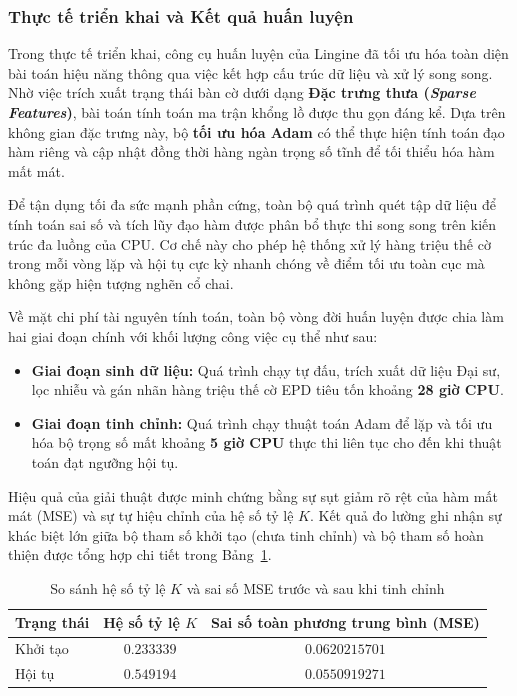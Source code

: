\subsubsection{Thực tế triển khai và Kết quả huấn luyện}

Trong thực tế triển khai, công cụ huấn luyện của Lingine đã tối ưu hóa toàn diện bài toán hiệu năng thông qua việc kết hợp cấu trúc dữ liệu và xử lý song song. Nhờ việc trích xuất trạng thái bàn cờ dưới dạng \textbf{Đặc trưng thưa (\textit{Sparse Features})}, bài toán tính toán ma trận khổng lồ được thu gọn đáng kể. Dựa trên không gian đặc trưng này, bộ \textbf{tối ưu hóa Adam} có thể thực hiện tính toán đạo hàm riêng và cập nhật đồng thời hàng ngàn trọng số tĩnh để tối thiểu hóa hàm mất mát.

Để tận dụng tối đa sức mạnh phần cứng, toàn bộ quá trình quét tập dữ liệu để tính toán sai số và tích lũy đạo hàm được phân bổ thực thi song song trên kiến trúc đa luồng của CPU. Cơ chế này cho phép hệ thống xử lý hàng triệu thế cờ trong mỗi vòng lặp và hội tụ cực kỳ nhanh chóng về điểm tối ưu toàn cục mà không gặp hiện tượng nghẽn cổ chai.

Về mặt chi phí tài nguyên tính toán, toàn bộ vòng đời huấn luyện được chia làm hai giai đoạn chính với khối lượng công việc cụ thể như sau:
\begin{itemize}
    \item \textbf{Giai đoạn sinh dữ liệu:} Quá trình chạy tự đấu, trích xuất dữ liệu Đại sư, lọc nhiễu và gán nhãn hàng triệu thế cờ EPD tiêu tốn khoảng \textbf{28 giờ CPU}.
    \item \textbf{Giai đoạn tinh chỉnh:} Quá trình chạy thuật toán Adam để lặp và tối ưu hóa bộ trọng số mất khoảng \textbf{5 giờ CPU} thực thi liên tục cho đến khi thuật toán đạt ngưỡng hội tụ.
\end{itemize}

Hiệu quả của giải thuật được minh chứng bằng sự sụt giảm rõ rệt của hàm mất mát (MSE) và sự tự hiệu chỉnh của hệ số tỷ lệ $K$. Kết quả đo lường ghi nhận sự khác biệt lớn giữa bộ tham số khởi tạo (chưa tinh chỉnh) và bộ tham số hoàn thiện được tổng hợp chi tiết trong Bảng~\ref{tab:texel_results}.

\begin{table}[htbp]
    \centering
    \begin{tabular}{lcc}
        \hline
        \textbf{Trạng thái} & \textbf{Hệ số tỷ lệ $K$} & \textbf{Sai số toàn phương trung bình (MSE)} \\ \hline
        Khởi tạo & $0.233339$ & $0.0620215701$ \\ 
        Hội tụ     & $0.549194$ & $0.0550919271$ \\ \hline
    \end{tabular}
    \caption{So sánh hệ số tỷ lệ $K$ và sai số MSE trước và sau khi tinh chỉnh}
    \label{tab:texel_results}
\end{table}

